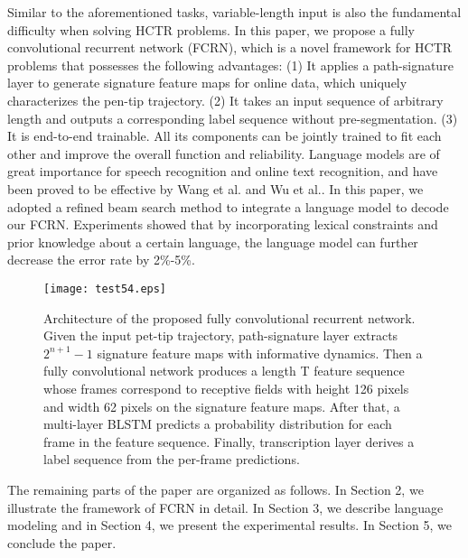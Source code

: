 \documentclass[10pt,conference,a4paper]{IEEEtran}
\begin{document}
Similar to the aforementioned tasks, variable-length input is also the fundamental difficulty when solving HCTR problems.
In this paper, we propose a fully convolutional recurrent network (FCRN), which is a novel framework for HCTR problems that possesses the following advantages:
(1) It applies a path-signature layer to generate signature feature maps for online data, which uniquely characterizes the pen-tip trajectory.
(2) It takes an input sequence of arbitrary length and outputs a corresponding label sequence without pre-segmentation.
(3) It is end-to-end trainable. All its components can be jointly trained to fit each other and improve the overall function and reliability.
Language models are of great importance for speech recognition and online text recognition, and have been proved to be effective by Wang et al.\cite{wang2012handwritten} and Wu et al.\cite{wu2015evaluation}.
In this paper, we adopted a refined beam search method to integrate a language model to decode our FCRN.
Experiments showed that by incorporating lexical constraints and prior knowledge about a certain language, the language model can further decrease the error rate by 2\%-5\%.
\begin{figure*}[th]
\centering
\texttt{[image: test54.eps]}
\caption{Architecture of the proposed fully convolutional recurrent network. Given the input pet-tip trajectory, path-signature layer extracts $2^{n+1}-1$ signature feature maps with informative dynamics. Then a fully convolutional network produces a length T feature sequence whose frames correspond to receptive fields with height 126 pixels and width 62 pixels on the signature feature maps.
After that, a multi-layer BLSTM predicts a probability distribution for each frame in the feature sequence. Finally, transcription layer derives a label sequence from the per-frame predictions.}
\label{FigureOverallSystem}
\end{figure*}


The remaining parts of the paper are organized as follows. In Section 2, we illustrate the framework of FCRN in detail. In Section 3, we describe language modeling and in Section 4, we present the experimental results. In Section 5, we conclude the paper.





\end{document}
